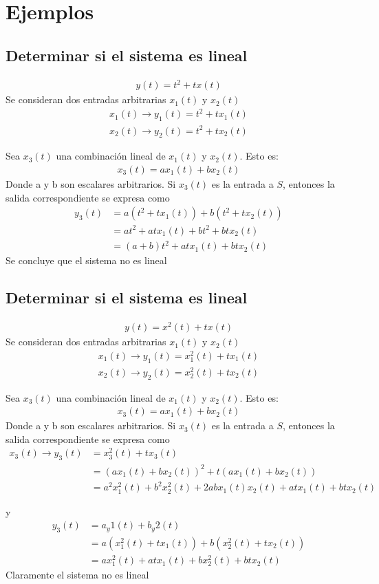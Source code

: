 \documentclass{article}
\begin{document}
\section{Ejemplos}
\subsection{Determinar si el sistema es lineal}
\begin{align}
	y(t) = t^2 + tx(t)
\end{align}
Se consideran dos entradas arbitrarias $x_1(t)$ y $x_2(t)$\\
\begin{align}
	x_1(t) \rightarrow y_1(t) = t^2 + tx_1(t)\\
	x_2(t) \rightarrow y_2(t) = t^2 + tx_2(t)
\end{align}

Sea $x_3(t)$ una combinación lineal de $x_1(t)$ y $x_2(t).$ Esto es:\\
\begin{align}
	x_3(t) = ax_1(t) + bx_2(t)
\end{align}
Donde a y b son escalares arbitrarios. Si $x_3(t) $ es la entrada a $S$, entonces la salida correspondiente se expresa como\\
\begin{align}
	y_3(t) &= a(t^2 + tx_1(t)) + b(t^2 + tx_2(t))\\
		   &= at^2 + atx_1(t) + bt^2 + btx_2(t)\\
		   &= (a+b)t^2 + atx_1(t) + btx_2(t)
\end{align}
Se concluye que el sistema no es lineal
\setcounter{equation}{0}
\subsection{Determinar si el sistema es lineal}
\begin{align}
y(t) = x^2(t) + tx(t)
\end{align}
Se consideran dos entradas arbitrarias $x_1(t)$ y $x_2(t)$\\
\begin{align}
x_1(t) \rightarrow y_1(t) = x_1^2(t) + tx_1(t)\\
x_2(t) \rightarrow y_2(t) = x_2^2(t) + tx_2(t)
\end{align}

Sea $x_3(t)$ una combinación lineal de $x_1(t)$ y $x_2(t).$ Esto es:\\
\begin{align}
x_3(t) = ax_1(t) + bx_2(t)
\end{align}
Donde a y b son escalares arbitrarios. Si $x_3(t) $ es la entrada a $S$, entonces la salida correspondiente se expresa como\\
\begin{align}
x_3(t) \rightarrow y_3(t) &= x_3^2(t) + tx_3(t)\\ 
						  &= (ax_1(t) + bx_2(t))^2 + t(ax_1(t) + bx_2(t))\\
						  &= a^2x_1^2(t) + b^2x_2^2(t) + 2abx_1(t)x_2(t) + atx_1(t) + btx_2(t)
\end{align}

y
\begin{align}
y_3(t) &= a_y1(t) + b_y2(t)\\ 
       &= a(x_1^2(t) + tx_1(t)) + b(x_2^2(t) + tx_2(t))\\
       &= ax_1^2(t) + atx_1(t) + bx_2^2(t) + btx_2(t)
\end{align} 
Claramente el sistema no es lineal
\end{document}
